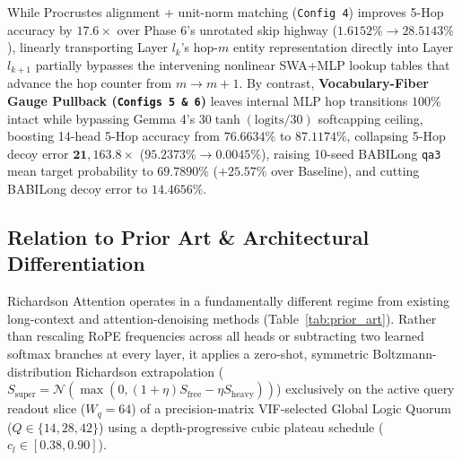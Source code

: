 \documentclass[11pt,letterpaper]{article}
\begin{document}
While Procrustes alignment + unit-norm matching (\texttt{Config 4}) improves 5-Hop accuracy by $17.6\times$ over Phase 6's unrotated skip highway ($1.6152\% \to 28.5143\%$), linearly transporting Layer $l_k$'s hop-$m$ entity representation directly into Layer $l_{k+1}$ partially bypasses the intervening nonlinear SWA+MLP lookup tables that advance the hop counter from $m \to m+1$. By contrast, \textbf{Vocabulary-Fiber Gauge Pullback (\texttt{Configs 5 \& 6})} leaves internal MLP hop transitions $100\%$ intact while bypassing Gemma 4's $30\tanh(\text{logits}/30)$ softcapping ceiling, boosting 14-head 5-Hop accuracy from $76.6634\%$ to $\mathbf{87.1174\%}$, collapsing 5-Hop decoy error $\mathbf{21,163.8\times}$ ($95.2373\% \to 0.0045\%$), raising 10-seed BABILong \texttt{qa3} mean target probability to $\mathbf{69.7890\%}$ ($+25.57\%$ over Baseline), and cutting BABILong decoy error to $\mathbf{14.4656\%}$.

\subsection{Relation to Prior Art \& Architectural Differentiation}

Richardson Attention operates in a fundamentally different regime from existing long-context and attention-denoising methods (Table~\ref{tab:prior_art}). Rather than rescaling RoPE frequencies across all heads or subtracting two learned softmax branches at every layer, it applies a zero-shot, symmetric Boltzmann-distribution Richardson extrapolation ($S_{\text{super}} = \mathcal{N}(\max(0, (1+\eta)S_{\text{free}} - \eta S_{\text{heavy}}))$) exclusively on the active query readout slice ($W_q = 64$) of a precision-matrix VIF-selected Global Logic Quorum ($Q \in \{14, 28, 42\}$) using a depth-progressive cubic plateau schedule ($c_l \in [0.38, 0.90]$).
\end{document}
